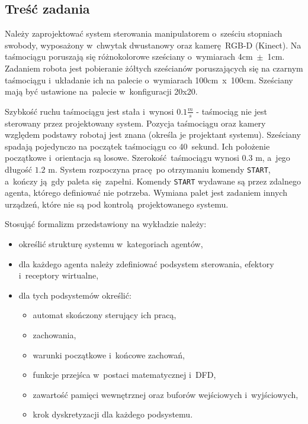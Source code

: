 \subsection{Treść zadania}
\label{subsec:polecenie}
Należy zaprojektować system sterowania manipulatorem o~sześciu stopniach swobody, wyposażony w~chwytak dwustanowy oraz kamerę RGB-D (Kinect). Na taśmociągu poruszają się różnokolorowe sześciany o~wymiarach 4cm~$\pm$~1cm. Zadaniem robota jest pobieranie żółtych sześcianów poruszających się na czarnym taśmociągu i~układanie ich na palecie o~wymiarach 100cm~x~100cm. Sześciany mają być ustawione na~palecie w~konfiguracji 20x20. 

Szybkość ruchu taśmociągu jest stała i~wynosi $\num{0,1}\frac{m}{s}$ - taśmociąg nie jest sterowany przez projektowany system. Pozycja taśmociągu oraz kamery względem podstawy robotaj jest znana (określa je projektant systemu). Sześciany spadają pojedynczo na początek taśmociągu co 40~sekund. Ich położenie początkowe i~orientacja są losowe. Szerokość taśmociągu wynosi $\num{0.3}$ m, a~jego długość $\num{1,2}$ m. System rozpoczyna pracę po otrzymaniu komendy \texttt{START}, a~kończy ją gdy paleta się zapełni. Komendy \texttt{START} wydawane są przez zdalnego agenta, którego definiować nie potrzeba. Wymiana palet jest zadaniem innych urządzeń, które nie są pod kontrolą projektowanego systemu.

Stosująć formalizm przedstawiony na wykładzie należy:
\begin{itemize}
    \item określić strukturę systemu w~kategoriach agentów,
    \item dla każdego agenta należy zdefiniować podsystem sterowania, efektory i~receptory wirtualne,
    \item dla tych podsystemów określić:
    \begin{itemize}
        \item automat skończony sterujący ich pracą,
        \item zachowania,
        \item warunki początkowe i~końcowe zachowań,
        \item funkcje przejśca w~postaci matematycznej i~DFD,
        \item zawartość pamięci wewnętrznej oraz buforów wejściowych i~wyjściowych,
        \item krok dyskretyzacji dla każdego podsystemu.
    \end{itemize}
\end{itemize}
